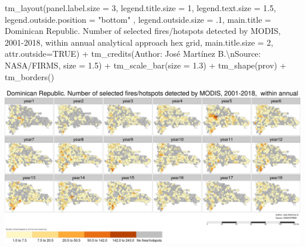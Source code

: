 \documentclass[10pt,landscape,a3paper]{article}
\newenvironment{Shaded}{\begin{snugshade}}{\end{snugshade}}
\newcommand{\AttributeTok}[1]{\textcolor[rgb]{0.77,0.63,0.00}{#1}}
\newcommand{\ConstantTok}[1]{\textcolor[rgb]{0.00,0.00,0.00}{#1}}
\newcommand{\DecValTok}[1]{\textcolor[rgb]{0.00,0.00,0.81}{#1}}
\newcommand{\FloatTok}[1]{\textcolor[rgb]{0.00,0.00,0.81}{#1}}
\newcommand{\FunctionTok}[1]{\textcolor[rgb]{0.00,0.00,0.00}{#1}}
\newcommand{\NormalTok}[1]{#1}
\newcommand{\SpecialCharTok}[1]{\textcolor[rgb]{0.00,0.00,0.00}{#1}}
\newcommand{\StringTok}[1]{\textcolor[rgb]{0.31,0.60,0.02}{#1}}
\begin{document}
\begin{Shaded}
\begin{Highlighting}[]
  \FunctionTok{tm\_layout}\NormalTok{(}\AttributeTok{panel.label.size =} \DecValTok{3}\NormalTok{, }\AttributeTok{legend.title.size =} \DecValTok{1}\NormalTok{, }\AttributeTok{legend.text.size =} \FloatTok{1.5}\NormalTok{,}
            \AttributeTok{legend.outside.position =} \StringTok{"bottom"}\NormalTok{ , }\AttributeTok{legend.outside.size =}\NormalTok{ .}\DecValTok{1}\NormalTok{,}
            \AttributeTok{main.title =} \StringTok{\textquotesingle{}Dominican Republic. Number of selected fires/hotspots detected by MODIS, 2001{-}2018,  within annual analytical approach hex grid\textquotesingle{}}\NormalTok{,}
            \AttributeTok{main.title.size =} \DecValTok{2}\NormalTok{, }\AttributeTok{attr.outside=}\ConstantTok{TRUE}\NormalTok{) }\SpecialCharTok{+} 
  \FunctionTok{tm\_credits}\NormalTok{(}\StringTok{\textquotesingle{}Author: José Martínez B.}\SpecialCharTok{\textbackslash{}n}\StringTok{Source: NASA/FIRMS\textquotesingle{}}\NormalTok{, }\AttributeTok{size =} \FloatTok{1.5}\NormalTok{) }\SpecialCharTok{+}
  \FunctionTok{tm\_scale\_bar}\NormalTok{(}\AttributeTok{size =} \FloatTok{1.3}\NormalTok{) }\SpecialCharTok{+}
  \FunctionTok{tm\_shape}\NormalTok{(prov) }\SpecialCharTok{+} \FunctionTok{tm\_borders}\NormalTok{()}
\end{Highlighting}
\end{Shaded}

\begin{center}\includegraphics{img/data-download-preparation-eda/zonal-annual-grid-3} \end{center}
\end{document}
